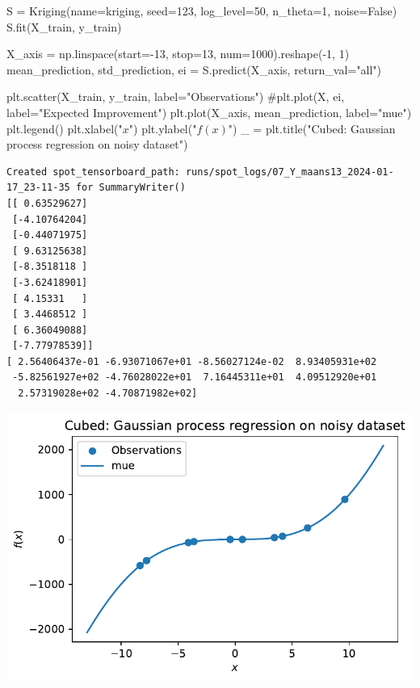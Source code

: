 \documentclass[
  letterpaper,
  DIV=11,
  numbers=noendperiod]{scrreprt}
\newenvironment{Shaded}{\begin{snugshade}}{\end{snugshade}}
\newcommand{\CommentTok}[1]{\textcolor[rgb]{0.37,0.37,0.37}{#1}}
\newcommand{\DecValTok}[1]{\textcolor[rgb]{0.68,0.00,0.00}{#1}}
\newcommand{\NormalTok}[1]{\textcolor[rgb]{0.00,0.23,0.31}{#1}}
\newcommand{\OperatorTok}[1]{\textcolor[rgb]{0.37,0.37,0.37}{#1}}
\newcommand{\StringTok}[1]{\textcolor[rgb]{0.13,0.47,0.30}{#1}}
\newcommand{\VariableTok}[1]{\textcolor[rgb]{0.07,0.07,0.07}{#1}}
\begin{document}
\begin{Shaded}
\begin{Highlighting}[]
\NormalTok{S }\OperatorTok{=}\NormalTok{ Kriging(name}\OperatorTok{=}\StringTok{\textquotesingle{}kriging\textquotesingle{}}\NormalTok{,  seed}\OperatorTok{=}\DecValTok{123}\NormalTok{, log\_level}\OperatorTok{=}\DecValTok{50}\NormalTok{, n\_theta}\OperatorTok{=}\DecValTok{1}\NormalTok{, noise}\OperatorTok{=}\VariableTok{False}\NormalTok{)}
\NormalTok{S.fit(X\_train, y\_train)}

\NormalTok{X\_axis }\OperatorTok{=}\NormalTok{ np.linspace(start}\OperatorTok{={-}}\DecValTok{13}\NormalTok{, stop}\OperatorTok{=}\DecValTok{13}\NormalTok{, num}\OperatorTok{=}\DecValTok{1000}\NormalTok{).reshape(}\OperatorTok{{-}}\DecValTok{1}\NormalTok{, }\DecValTok{1}\NormalTok{)}
\NormalTok{mean\_prediction, std\_prediction, ei }\OperatorTok{=}\NormalTok{ S.predict(X\_axis, return\_val}\OperatorTok{=}\StringTok{"all"}\NormalTok{)}

\NormalTok{plt.scatter(X\_train, y\_train, label}\OperatorTok{=}\StringTok{"Observations"}\NormalTok{)}
\CommentTok{\#plt.plot(X, ei, label="Expected Improvement")}
\NormalTok{plt.plot(X\_axis, mean\_prediction, label}\OperatorTok{=}\StringTok{"mue"}\NormalTok{)}
\NormalTok{plt.legend()}
\NormalTok{plt.xlabel(}\StringTok{"$x$"}\NormalTok{)}
\NormalTok{plt.ylabel(}\StringTok{"$f(x)$"}\NormalTok{)}
\NormalTok{\_ }\OperatorTok{=}\NormalTok{ plt.title(}\StringTok{"Cubed: Gaussian process regression on noisy dataset"}\NormalTok{)}
\end{Highlighting}
\end{Shaded}

\begin{verbatim}
Created spot_tensorboard_path: runs/spot_logs/07_Y_maans13_2024-01-17_23-11-35 for SummaryWriter()
[[ 0.63529627]
 [-4.10764204]
 [-0.44071975]
 [ 9.63125638]
 [-8.3518118 ]
 [-3.62418901]
 [ 4.15331   ]
 [ 3.4468512 ]
 [ 6.36049088]
 [-7.77978539]]
[ 2.56406437e-01 -6.93071067e+01 -8.56027124e-02  8.93405931e+02
 -5.82561927e+02 -4.76028022e+01  7.16445311e+01  4.09512920e+01
  2.57319028e+02 -4.70871982e+02]
\end{verbatim}

\includegraphics{012_num_spot_ei_files/figure-pdf/cell-53-output-2.pdf}
\end{document}
